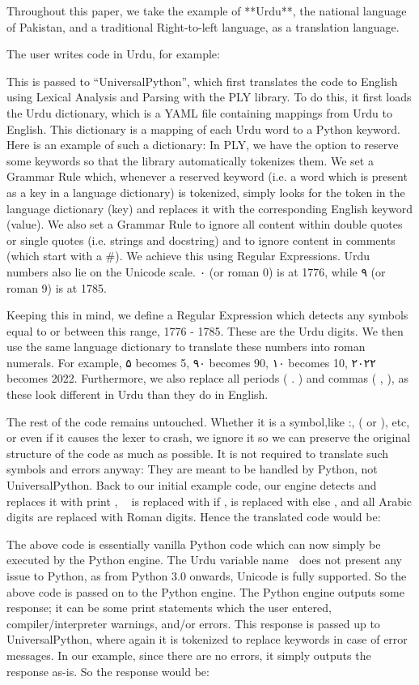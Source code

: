 \documentclass[conference]{IEEEtran}
\begin{document}
Throughout this paper, we take the example of **Urdu**, the national language of Pakistan, and a traditional Right-to-left language, as a translation language. 

The user writes code in Urdu, for example:


This is passed to “UniversalPython”, which first translates the code to English using Lexical Analysis and Parsing with the PLY library.
To do this, it first loads the Urdu dictionary, which is a YAML file containing mappings from Urdu to English. This dictionary is a mapping of each Urdu word to a Python keyword. Here is an example of such a dictionary:
In PLY, we have the option to reserve some keywords so that the library automatically tokenizes them. We set a Grammar Rule which, whenever a reserved keyword (i.e. a word which is present as a key in a language dictionary) is tokenized, simply looks for the token in the language dictionary (key) and replaces it with the corresponding English keyword (value).
We also set a Grammar Rule to ignore all content within double quotes or single quotes (i.e. strings and docstring) and to ignore content in comments (which start with a \#). We achieve this using Regular Expressions.
Urdu numbers also lie on the Unicode scale. ۰ (or roman 0) is at 1776, while ۹ (or roman 9) is at 1785.

Keeping this in mind, we define a Regular Expression which detects any symbols equal to or between this range, 1776 - 1785. These are the Urdu digits. We then use the same language dictionary to translate these numbers into roman numerals. For example, ۵ becomes 5, ۹۰ becomes 90, ۱۰ becomes 10, ۲۰۲۲ becomes 2022.
Furthermore, we also replace all periods ( . ) and commas ( , ), as these look different in Urdu than they do in English.

The rest of the code remains untouched. Whether it is a symbol,like :, ( or ), etc, or even if it causes the lexer to crash, we ignore it so we can preserve the original structure of the code as much as possible. It is not required to translate such symbols and errors anyway: They are meant to be handled by Python, not UniversalPython. Back to our initial example code, our engine detects and replaces it with print , 􏰁􏰃 is replaced with if ,
is replaced with else , and all Arabic digits are replaced with Roman digits. Hence the translated code would be:

The above code is essentially vanilla Python code which can now simply be executed by the Python engine. The Urdu variable name 􏰀 does not present any issue to Python, as from Python 3.0 onwards, Unicode is fully supported. So the above code is passed on to the Python engine. The Python engine outputs some response; it can be some print statements which the user entered, compiler/interpreter warnings, and/or errors. This response is passed up to UniversalPython, where again it is tokenized to replace keywords in case of error messages. In our example, since there are no errors, it simply outputs the response as-is. So the response would be:
\end{document}
